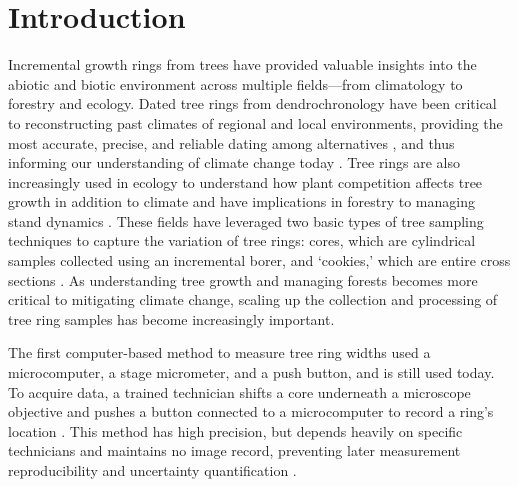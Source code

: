 \documentclass[a4paper,12pt]{article}
\begin{document}
\section{Introduction}
Incremental growth rings from trees have provided valuable insights into the abiotic and biotic environment across multiple fields---from climatology to forestry and ecology. Dated tree rings from dendrochronology have been critical to
reconstructing past climates of regional and local environments, providing the most accurate, precise, and reliable dating among alternatives \citep{mann_northern_1999}, and thus informing  our understanding of climate change today \citep{fritts_dendroclimatology_1971,williams_using_2010,guibal_dendrochronology_2021,sheppard_dendroclimatology_2010,williams_large_2020}. Tree rings are also increasingly used in ecology to understand how plant competition affects tree growth in addition to climate \citep{buechling_climate_2017} and have implications in forestry to managing stand dynamics \citep{canham_neighborhood_2004}. These fields have leveraged two basic types of tree sampling techniques to capture the variation of tree rings: cores, which are cylindrical samples collected using an incremental borer, and `cookies,' which are entire cross sections \citep[and thus allow measuring as many radii from the sample as desired,][]{speer_fundamentals_2010}. As understanding tree growth and managing forests becomes more critical to mitigating climate change, scaling up the collection and processing of tree ring samples has become increasingly important.

The first computer-based method to measure tree ring widths used a microcomputer, a stage micrometer, and a push button, and is still used today. To acquire data, a trained technician shifts a core underneath a microscope objective and pushes a button connected to a microcomputer to record a ring's location \citep{robinson_microcomputer_1980}.
This method has high precision, but depends heavily on specific technicians and maintains no image record, preventing later measurement reproducibility and uncertainty quantification \citep{levanic_atrics_2007}.
\end{document}
